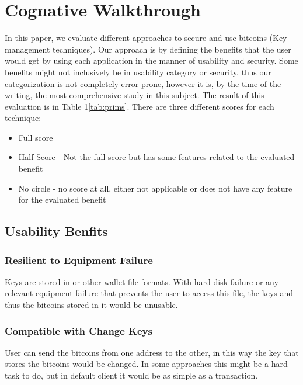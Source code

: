 
\section{Cognative Walkthrough}




In this paper, we evaluate different approaches to secure and use bitcoins (Key management techniques). Our approach is by defining the benefits that the user would get by using each application in the manner of usability and security.
Some benefits might not inclusively be in usability category or security, thus our categorization is not completely error prone, however it is, by the time of the writing, the most comprehensive  study in this subject.
The result of this evaluation is in Table 1\ref{tab:prims}. There are three different scores for each technique:\\

\begin{itemize}
\renewcommand{\labelitemi}{$\bullet$}
\item Full score
\renewcommand{\labelitemi}{$\circ$}
\item Half Score - Not the full score but has some features related to the evaluated benefit
\renewcommand{\labelitemi}{$\textvisiblespace$}
\item No circle - no score at all, either not applicable or does not have any feature for the evaluated benefit
\end{itemize}



\subsection{Usability Benfits}

\subsubsection{Resilient to Equipment Failure}
\label{Resilient to Equipment Failure}
Keys are stored in \walletfile or other wallet file formats. With hard disk failure or any relevant equipment failure that prevents the user to access this file, the keys and thus the bitcoins stored in it would be unusable.

\subsubsection{Compatible with Change Keys}
\label{Compatible with Change Keys}
User can send the bitcoins from one address to the other, in this way the key that stores the bitcoins would be changed. In some approaches this might be a hard task to do, but in default client it would be as simple as a transaction.

